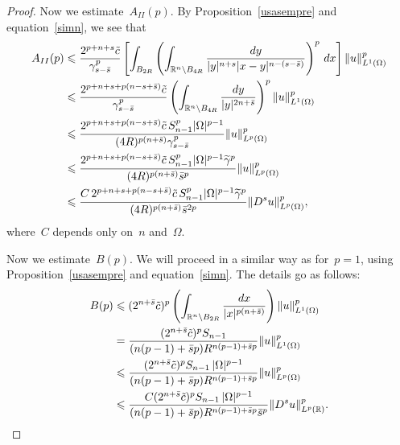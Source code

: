 \documentclass[11pt,hyp,]{nyjm}
\numberwithin{equation}{section}
\newcommand{\R}{\mathbb{R}}
\theoremstyle{remark}
\newcommand{\bs}{\Bar{s}}
\renewcommand{\leq}{\leqslant}
\renewcommand{\le}{\leqslant}
\begin{document}
\begin{proof}
			Now we estimate~$A_{II}(p)$. By Proposition~\ref{usasempre} and equation~\eqref{simn}, we see that
\begin{equation*}\begin{split}
A_{II}(p) &\leq \frac{2^{p+n+s} \Tilde{c}}{\gamma^p_{s-\bar{s}}}  \left[ \int_{B_{2R}} \left( \int_{\R^n \setminus B_{4R}} \frac{dy}{|y|^{n+s} |x-y|^{n-(s-\bs)}}\right)^p \, dx \right] \Vert u \Vert_{L^1(\Omega)}^p \\ & 
\leq  \frac{2^{p+n+s+p(n-s+\bar s)} \Tilde{c}}{\gamma^p_{s-\bar{s}}}
\left(\int_{\R^n \setminus B_{4R}} \frac{dy}{|y|^{2n+ \bs}}\right)^p \Vert u \Vert_{L^1(\Omega)}^p \\&\le
\frac{2^{p+n+s+p(n-s+\bar s)} \Tilde{c}\,S_{n-1}^p|\Omega|^{p-1}}{(4R)^{p(n+\bar s)}\gamma^p_{s-\bar{s}}} \Vert u \Vert_{L^p(\Omega)}^p\\&  \leq
\frac{2^{p+n+s+p(n-s+\bar s)} \Tilde{c}\,S_{n-1}^p|\Omega|^{p-1}\widetilde\gamma^p}{(4R)^{p(n+\bar s)}\bar{s}^p} \Vert u \Vert_{L^p(\Omega)}^p\\&\le 
\frac{C\,2^{p+n+s+p(n-s+\bar s)} \Tilde{c}\,S_{n-1}^p|\Omega|^{p-1}\widetilde\gamma^p}{(4R)^{p(n+\bar s)}\bar{s}^{2p}} \Vert D^su \Vert_{L^p(\Omega)}^p
,\end{split}\end{equation*}
where~$C$ depends only on~$n$ and~$\Omega$.
			
Now we estimate~$B(p)$. We will proceed in a similar way as for~$p=1$,
using Proposition~\ref{usasempre} and equation~\eqref{simn}. The details go as follows:
\begin{equation*}\begin{split}
B(p)& \leq (2^{n+ \bar{s}} \Tilde{c})^p  \left( \int_{\R^n \setminus B_{2R}} \frac{dx}{|x|^{p(n+ \bs)}}\right) \Vert u \Vert^p_{L^1(\Omega)} \\
& =  \frac{(2^{n+ \bar{s}} \Tilde{c})^p S_{n-1} }{(n(p-1)+ \bar{s}p) R^{n(p-1)+ \bar{s}p}} \Vert u \Vert^p_{L^1(\Omega)}\\&\leq 
\frac{(2^{n+ \bar{s}} \Tilde{c})^p S_{n-1}\,|\Omega|^{p-1} }{(n(p-1)+ \bar{s}p) R^{n(p-1)+ \bar{s}p}} \Vert u \Vert^p_{L^p(\Omega)}
\\& \le \frac{C(2^{n+ \bar{s}} \Tilde{c})^p S_{n-1}\,|\Omega|^{p-1} }{(n(p-1)+ \bar{s}p) R^{n(p-1)+ \bar{s}p}\bar{s}^p}  \Vert D^s u \Vert^p_{L^p(\R)}.
\end{split}\end{equation*}


\end{proof}
\end{document}
